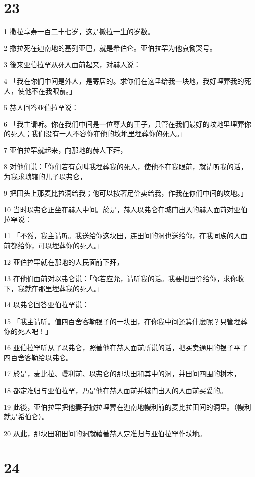 \chapter{23}

\par 1 撒拉享寿一百二十七岁，这是撒拉一生的岁数。
\par 2 撒拉死在迦南地的基列亚巴，就是希伯仑。亚伯拉罕为他哀恸哭号。
\par 3 後来亚伯拉罕从死人面前起来，对赫人说：
\par 4 「我在你们中间是外人，是寄居的。求你们在这里给我一块地，我好埋葬我的死人，使他不在我眼前。」
\par 5 赫人回答亚伯拉罕说：
\par 6 「我主请听。你在我们中间是一位尊大的王子，只管在我们最好的坟地里埋葬你的死人；我们没有一人不容你在他的坟地里埋葬你的死人。」
\par 7 亚伯拉罕就起来，向那地的赫人下拜，
\par 8 对他们说：「你们若有意叫我埋葬我的死人，使他不在我眼前，就请听我的话，为我求琐辖的儿子以弗仑，
\par 9 把田头上那麦比拉洞给我；他可以按著足价卖给我，作我在你们中间的坟地。」
\par 10 当时以弗仑正坐在赫人中间。於是，赫人以弗仑在城门出入的赫人面前对亚伯拉罕说：
\par 11 「不然，我主请听。我送给你这块田，连田间的洞也送给你，在我同族的人面前都给你，可以埋葬你的死人。」
\par 12 亚伯拉罕就在那地的人民面前下拜，
\par 13 在他们面前对以弗仑说：「你若应允，请听我的话。我要把田价给你，求你收下，我就在那里埋葬我的死人。」
\par 14 以弗仑回答亚伯拉罕说：
\par 15 「我主请听。值四百舍客勒银子的一块田，在你我中间还算什麽呢？只管埋葬你的死人吧！」
\par 16 亚伯拉罕听从了以弗仑，照著他在赫人面前所说的话，把买卖通用的银子平了四百舍客勒给以弗仑。
\par 17 於是，麦比拉、幔利前、以弗仑的那块田和其中的洞，并田间四围的树木，
\par 18 都定准归与亚伯拉罕，乃是他在赫人面前并城门出入的人面前买妥的。
\par 19 此後，亚伯拉罕把他妻子撒拉埋葬在迦南地幔利前的麦比拉田间的洞里。（幔利就是希伯仑）。
\par 20 从此，那块田和田间的洞就藉著赫人定准归与亚伯拉罕作坟地。

\chapter{24}

